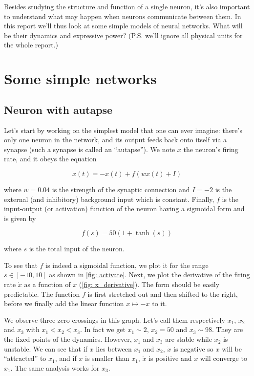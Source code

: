 Besides studying the structure and function of a single neuron, it's also
important to understand what may happen when neurons communicate between them.
In this report we'll thus look at some simple models of neural networks.
What will be their dynamics and expressive power? 
(P.S. we'll ignore all physical units for the whole report.)

\section{Some simple networks}

\subsection{Neuron with autapse}

Let's start by working on the simplest model that one can ever imagine:
there's only one neuron in the network, and its output feeds back onto 
itself via a synapse (such a synapse is called an ``autapse''). 
We note $x$ the neuron's firing rate, and it obeys the equation

\[\dot{x}(t) = -x(t) + f(wx(t)+I)\]

\noindent
where $w = 0.04$ is the strength of the synaptic connection and $I = -2$ 
is the external (and inhibitory) background input which is constant.
Finally, $f$ is the input-output (or activation) function of the neuron having
a sigmoidal form and is given by

\[f(s) = 50(1 + \tanh(s))\]

\noindent
where $s$ is the total input of the neuron.

To see that $f$ is indeed a sigmoidal function, we plot it for the range 
$s \in [-10, 10]$ as shown in \autoref{fig: activate}. Next, we plot the
derivative of the firing rate $\dot{x}$ as a function of $x$ 
(\autoref{fig: x_derivative}). The form should be easily predictable.
The function $f$ is first stretched out and then shifted to the right,
before we finally add the linear function $x \mapsto -x$ to it.

We observe three zero-crossings in this graph. Let's call them respectively
$x_1$, $x_2$ and $x_3$ with $x_1 < x_2 < x_3$. In fact we get $x_1 \sim 2$,
$x_2 = 50$ and $x_3 \sim 98$. They are the fixed points of the dynamics.
However, $x_1$ and $x_3$ are stable while $x_2$ is unstable.
We can see that if $x$ lies between $x_1$ and $x_2$, $\dot{x}$ is negative
so $x$ will be ``attracted'' to $x_1$, and if $x$ is smaller than $x_1$,
$\dot{x}$ is positive and $x$ will converge to $x_1$. The same analysis
works for $x_3$.

